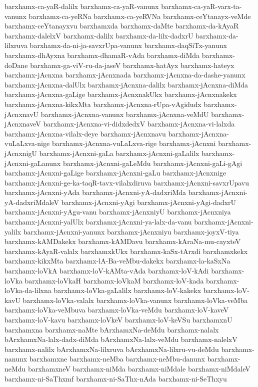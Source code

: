 {barxhamx-ca-yaR-dalilx
barxhamx-ca-yaR-vanunx
barxhamx-ca-yaR-varx-ta-vanunx
barxhamx-ca-yeRNa
barxhamx-ca-yeRVNa
barxhamx-ceYtanayx-veMde
barxhamx-ceYtanayxvu
barxhamxda
barxhamx-daMte
barxhamx-da-kAyaR
barxhamx-dalelxV
barxhamx-dalilx
barxhamx-da-lilx-dadxrU
barxhamx-da-lilxruva
barxhamx-da-ni-ja-savxrUpa-vanunx
barxhamx-daqSiTx-yanunx
barxhamx-dhAyxna
barxhamx-dhamaR-vAda
barxhamx-diMda
barxhamx-doDane
barxhamx-ga-viV-ru-da-jaseV
barxhamx-hatAyx
barxhamx-hateyx
barxhamx-jAcnxna
barxhamx-jAcnxnada
barxhamx-jAcnxna-da-dashe-yanunx
barxhamx-jAcnxna-dalUlx
barxhamx-jAcnxna-dalilx
barxhamx-jAcnxna-diMda
barxhamx-jAcnxna-gaLige
barxhamx-jAcnxnakUkx
barxhamx-jAcnxnakekx
barxhamx-jAcnxna-kikxMta
barxhamx-jAcnxna-rUpa-vAgidudx
barxhamx-jAcnxnavU
barxhamx-jAcnxna-vanunx
barxhamx-jAcnxna-veMdU
barxhamx-jAcnxnaveV
barxhamx-jAcnxna-vi-didxdedxV
barxhamx-jAcnxna-vi-lalxda
barxhamx-jAcnxna-vilalx-deye
barxhamx-jAcnxnavu
barxhamx-jAcnxna-vuLaLxva-nige
barxhamx-jAcnxna-vuLaLxva-rige
barxhamx-jAcnxni
barxhamx-jAcnxnigU
barxhamx-jAcnxni-gaLa
barxhamx-jAcnxni-gaLalilx
barxhamx-jAcnxni-gaLanunx
barxhamx-jAcnxni-gaLeMdu
barxhamx-jAcnxni-gaLi-gAgi
barxhamx-jAcnxni-gaLige
barxhamx-jAcnxni-gaLu
barxhamx-jAcnxnige
barxhamx-jAcnxni-ge-ka-taqR-tavx-vilalxdiruva
barxhamx-jAcnxni-savxrUpavu
barxhamx-jAcnxni-yAda
barxhamx-jAcnxni-yA-dadxriMda
barxhamx-jAcnxni-yA-dadxriMdaleV
barxhamx-jAcnxni-yAgi
barxhamx-jAcnxni-yAgi-dadxrU
barxhamx-jAcnxni-yAgu-vanu
barxhamx-jAcnxniyU
barxhamx-jAcnxniya
barxhamx-jAcnxni-yalUlx
barxhamx-jAcnxni-ya-lalx-da-vanu
barxhamx-jAcnxni-yalilx
barxhamx-jAcnxni-yanunx
barxhamx-jAcnxniyu
barxhamx-joyxV-tiya
barxhamx-kAMDakekx
barxhamx-kAMDavu
barxhamx-kAraNa-mu-cayxteV
barxhamx-kAyaR-valalx
barxhamxkUkx
barxhamx-kaSx-tArxdi
barxhamxkekx
barxhamx-kikxMta
barxhamx-lA-Ba-veMbu-dakekx
barxhamx-la-kaSxNa
barxhamx-loVkA
barxhamx-loV-kAMta-vAda
barxhamx-loV-kAdi
barxhamx-loVka
barxhamx-loVkaH
barxhamx-loVkaM
barxhamx-loV-kada
barxhamx-loVka-da-lilxna
barxhamx-loVka-gaLalilx
barxhamx-loV-kakekx
barxhamx-loV-kavU
barxhamx-loVka-valalx
barxhamx-loVka-vanunx
barxhamx-loVka-veMba
barxhamx-loVka-veMbuva
barxhamx-loVka-veMdu
barxhamx-loV-kaveV
barxhamx-loV-kavu
barxhamx-loVkeV
barxhamx-loV-keVSu
barxhamxnU
barxhamxna
barxhamx-naMte
bArxhamxNa-deMdu
barxhamx-nalalx
bArxhamxNa-lalx-dadx-diMda
bArxhamxNa-lalx-veMdu
barxhamx-nalelxV
barxhamx-nalilx
bArxhamxNa-lilxruva
bArxhamxNa-lilxru-vu-deMdu
barxhamx-nanunx
barxhamxne
barxhamx-neMba
barxhamx-neMbu-danunx
barxhamx-neMdu
barxhamxneV
barxhamx-niMda
barxhamx-niMdale
barxhamx-niMdaleV
barxhamx-ni-SaThxmf
barxhamx-ni-SaThx-nAda
barxhamx-ni-SeThxyu
}

